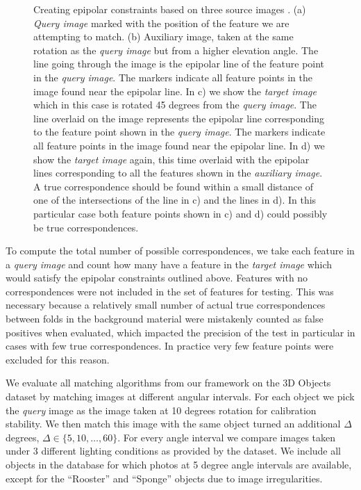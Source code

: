 \documentclass[review]{elsarticle}
\begin{document}
\begin{figure}[htb]
\begin{subfigure}[t]{0.22\columnwidth}
        \label{fig:frog_c_lines}
    \end{subfigure}%
    \caption{Creating epipolar constraints based on three source images \cite{moreels2007evaluation}.  (a) \emph{Query image} marked with the position of the feature we are attempting to match. (b) Auxiliary image, taken at the same rotation as the \emph{query image} but from a higher elevation angle. The line going through the image is the epipolar line of the feature point in the \emph{query image}.  The markers indicate all feature points in the image found near the epipolar line.  In c) we show the \emph{target image} which in this case is rotated 45 degrees from the \emph{query image}.  The line overlaid on the image represents the epipolar line corresponding to the feature point shown in the \emph{query image}.  The markers indicate all feature points in the image found near the epipolar line. In d) we show the \emph{target image} again, this time overlaid with the epipolar lines corresponding to all the features shown in the \emph{auxiliary image}. A true correspondence should be found within a small distance of one of the intersections of the line in c) and the lines in d). In this particular case both feature points shown in c) and d) could possibly be true correspondences.
}%
    \label{fig:frog}%
\end{figure}%

To compute the total number of possible correspondences, we take each feature in a \emph{query image} and count how many have a feature in the \emph{target image} which would satisfy the epipolar constraints outlined above. Features with no correspondences were not included in the set of features for testing. This was necessary because a relatively small number of actual true correspondences between folds in the background material were mistakenly counted as false positives when evaluated, which impacted the precision of the test in particular in cases with few true correspondences. In practice very few feature points were excluded for this reason.

We evaluate all matching algorithms from our framework on the 3D Objects dataset by matching images at different angular intervals. For each object we pick the \emph{query} image as the image taken at 10 degrees rotation for calibration stability.  We then match this image with the same object turned an additional $\Delta$ degrees, $\Delta \in \{5, 10, \ldots, 60\}$.  For every angle interval we compare images taken under 3 different lighting conditions as provided by the dataset. We include all objects in the database for which photos at 5 degree angle intervals are available, except for the ``Rooster'' and ``Sponge'' objects due to image irregularities. 
\end{document}
